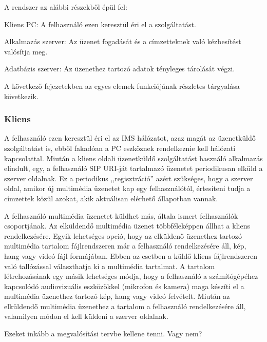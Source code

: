 A rendszer az alábbi részekből épül fel:
\begin{mydescription}
\item[Kliens PC:] A felhasználó ezen keresztül éri el a szolgáltatást.
\item[Alkalmazás szerver:] Az üzenet fogadását és a címzetteknek való kézbesítést valósítja meg.
\item[Adatbázis szerver:] Az üzenethez tartozó adatok tényleges tárolását végzi.
\end{mydescription}

A következő fejezetekben az egyes elemek funkciójának részletes tárgyalása következik.

\subsubsection{Kliens}
\label{sec:kliens_pc}

A felhasználó ezen keresztül éri el az IMS hálózatot, azaz magát az üzenetküldő szolgáltatást is, ebből fakadóan a PC eszköznek rendelkeznie kell hálózati kapcsolattal. Miután a kliens oldali üzenetküldő szolgáltatást használó alkalmazás elindult, egy, a felhasználó SIP URI-ját tartalmazó üzenetet periodikusan elküld a szerver oldalnak. Ez a periodikus ,,regisztráció'' azért szükséges, hogy a szerver oldal, amikor új multimédia üzenetet kap egy felhasználótól, értesíteni tudja a címzettek közül azokat, akik aktuálisan elérhető állapotban vannak. 

A felhasználó multimédia üzenetet küldhet más, általa ismert felhasználók csoportjának. Az elküldendő multimédia üzenet többféleképpen állhat a kliens rendelkezésére. Egyik lehetséges opció, hogy az elküldenő üzenethez tartozó multimédia tartalom fájlrendszeren már a felhasználó rendelkezésére áll, kép, hang vagy videó fájl formájában. Ebben az esetben a küldő kliens fájlrendszeren való tallózással választhatja ki a multimédia tartalmat. A tartalom létrehozásának egy másik lehetséges módja, hogy a felhasználó a számítógépéhez kapcsolódó audiovizuális eszközökkel (mikrofon és kamera) maga készíti el a multimédia üzenethez tartozó kép, hang vagy videó felvételt. Miután az elküldendő multimédia üzenethez a tartalom a felhasználó rendelkezésére áll, valamilyen módon el kell küldeni a szerver oldalnak.

{\color{red}Ezeket inkább a megvalósítási tervbe kellene tenni. Vagy nem?}

